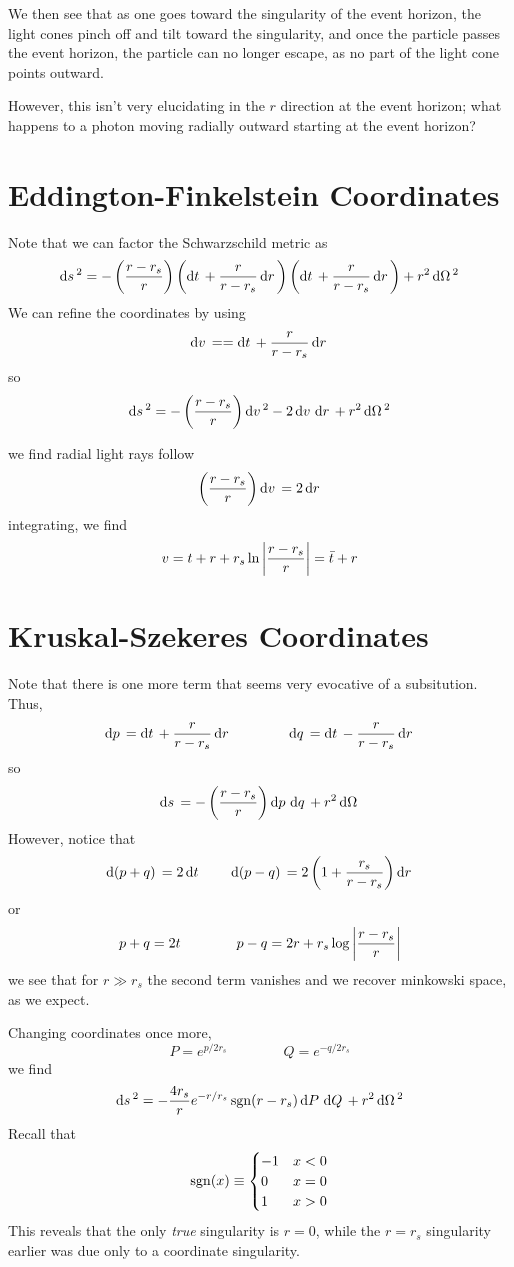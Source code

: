 We then see that as one goes toward the singularity of the event horizon, the light cones pinch off and tilt toward the singularity, and once the particle passes the event horizon, the particle can no longer escape, as no part of the light cone points outward.

However, this isn't very elucidating in the \(r\) direction at the event horizon; what happens to a photon moving radially outward starting at the event horizon?

\section{Eddington-Finkelstein Coordinates}
Note that we can factor the Schwarzschild metric as
\[\d{s}^2 = -\left(\frac{r-r_s}{r}\right)\left(\d{t}+\frac{r}{r-r_s}\d{r}\right)\left(\d t + \frac{r}{r-r_s}\d{r}\right)+ r^2\d\Omega^2\]
We can refine the coordinates by using
\[\d{v}= = \d{t}+\frac{r}{r-r_s}\d{r}\]
so
\[\d{s}^2 = -\left(\frac{r-r_s}{r}\right)\d{v}^2 - 2\d{v}\d{r} + r^2\d\Omega^2\]

we find radial light rays follow
\[\left(\frac{r-r_s}{r}\right)\d{v}=2\d{r}\]
integrating, we find
\[v=  t + r + r_s\ln\left|\dfrac{r-r_s}{r}\right| = \bar t + r\]
\section{Kruskal-Szekeres Coordinates}
Note that there is one more term that seems very evocative of a subsitution. Thus, 
\[\d p = \d t + \frac{r}{r-r_s}\d{r} \qquad\qquad \d q = \d t - \frac{r}{r-r_s}\d{r}\]
so
\[\d{s} = -\left(\frac{r-r_s}{r}\right)\d p\d q + r^2\d \Omega\]
However, notice that
\[\d{(p+q)} = 2\d t \qquad \d{(p-q)} = 2\left(1+\frac{r_s}{r-r_s}\right)\d{r}\]
or
\[p+q = 2t \qquad\qquad p-q = 2r+r_s\log\left|\dfrac{r-r_s}{r}\right|\]
we see that for \(r\gg r_s\) the second term vanishes and we recover minkowski space, as we expect.

Changing coordinates once more,
\[P = e^{p/2r_s} \qquad\qquad Q=e^{-q/2r_s}\]
we find
\[\d{s}^2 = -\frac{4r_s}{r}e^{-r/r_s}\sgn(r-r_s)\d{P}\d{Q} + r^2\d\Omega^2\]
Recall that
\[\operatorname{sgn}(x)\equiv \begin{cases}
	-1 & x<0\\
	0 & x = 0\\
	1 & x > 0
\end{cases}\]
This reveals that the only \emph{true} singularity is \(r=0\), while the \(r=r_s\) singularity earlier was due only to a coordinate singularity.

